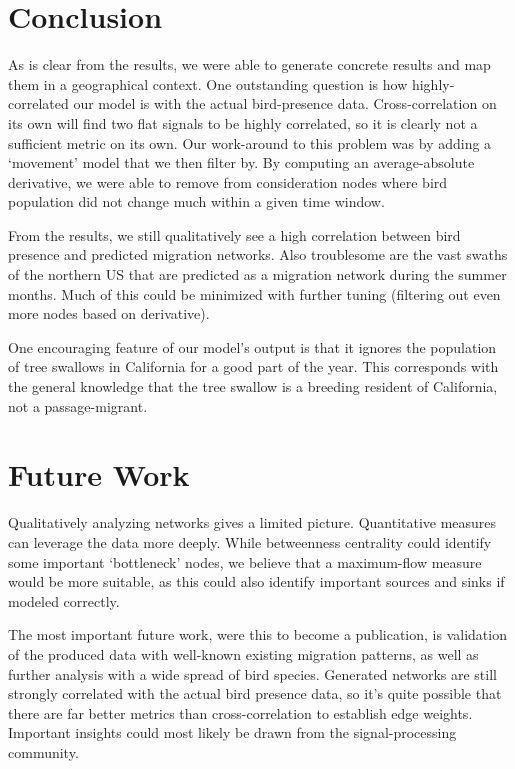 \section{Conclusion}
As is clear from the results, we were able to generate concrete results and map them in a geographical context. One outstanding question is how highly-correlated our model is with the actual bird-presence data. Cross-correlation on its own will find two flat signals to be highly correlated, so it is clearly not a sufficient metric on its own. Our work-around to this problem was by adding a `movement' model that we then filter by. By computing an average-absolute derivative, we were able to remove from consideration nodes where bird population did not change much within a given time window. 

From the results, we still qualitatively see a high correlation between bird presence and predicted migration networks. Also troublesome are the vast swaths of the northern US that are predicted as a migration network during the summer months. Much of this could be minimized with further tuning (filtering out even more nodes based on derivative). 

One encouraging feature of our model's output is that it ignores the population of tree swallows in California for a good part of the year. This corresponds with the general knowledge that the tree swallow is a breeding resident of California, not a passage-migrant. 

\section{Future Work}
Qualitatively analyzing networks gives a limited picture. Quantitative measures can leverage the data more deeply. While betweenness centrality could identify some important `bottleneck' nodes, we believe that a maximum-flow measure would be more suitable, as this could also identify important sources and sinks if modeled correctly.

The most important future work, were this to become a publication, is validation of the produced data with well-known existing migration patterns, as well as further analysis with a wide spread of bird species. Generated networks are still strongly correlated with the actual bird presence data, so it's quite possible that there are far better metrics than cross-correlation to establish edge weights. Important insights could most likely be drawn from the signal-processing community. 